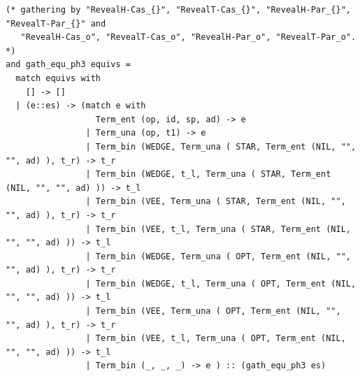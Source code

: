 \documentclass[12pt]{article}
\begin{document}
\begin{tiny}
\begin{verbatim}
(* gathering by "RevealH-Cas_{}", "RevealT-Cas_{}", "RevealH-Par_{}", "RevealT-Par_{}" and
   "RevealH-Cas_o", "RevealT-Cas_o", "RevealH-Par_o", "RevealT-Par_o". *)
and gath_equ_ph3 equivs =
  match equivs with
    [] -> []
  | (e::es) -> (match e with
                  Term_ent (op, id, sp, ad) -> e
                | Term_una (op, t1) -> e
                | Term_bin (WEDGE, Term_una ( STAR, Term_ent (NIL, "", "", ad) ), t_r) -> t_r
                | Term_bin (WEDGE, t_l, Term_una ( STAR, Term_ent (NIL, "", "", ad) )) -> t_l
                | Term_bin (VEE, Term_una ( STAR, Term_ent (NIL, "", "", ad) ), t_r) -> t_r
                | Term_bin (VEE, t_l, Term_una ( STAR, Term_ent (NIL, "", "", ad) )) -> t_l
                | Term_bin (WEDGE, Term_una ( OPT, Term_ent (NIL, "", "", ad) ), t_r) -> t_r
                | Term_bin (WEDGE, t_l, Term_una ( OPT, Term_ent (NIL, "", "", ad) )) -> t_l
                | Term_bin (VEE, Term_una ( OPT, Term_ent (NIL, "", "", ad) ), t_r) -> t_r
                | Term_bin (VEE, t_l, Term_una ( OPT, Term_ent (NIL, "", "", ad) )) -> t_l
                | Term_bin (_, _, _) -> e ) :: (gath_equ_ph3 es)



\end{verbatim}
\end{tiny}
\end{document}
